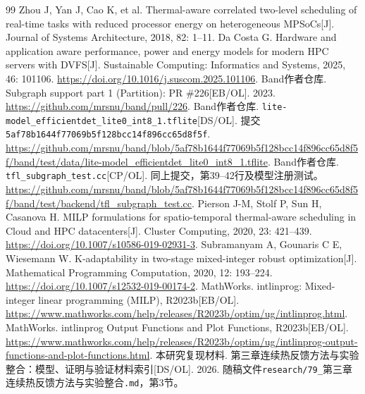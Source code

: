 \documentclass[UTF8,a4paper,12pt,openany,fontset=windows]{ctexbook}
\begin{document}
\setcounter{chapter}{2}

\begin{thebibliography}{99}
Zhou J, Yan J, Cao K, et al.
Thermal-aware correlated two-level scheduling of real-time tasks with reduced processor energy on heterogeneous MPSoCs[J].
Journal of Systems Architecture, 2018, 82: 1--11.
Da Costa G.
Hardware and application aware performance, power and energy models for modern HPC servers with DVFS[J].
Sustainable Computing: Informatics and Systems, 2025, 46: 101106.
\url{https://doi.org/10.1016/j.suscom.2025.101106}.
Band作者仓库.
Subgraph support part 1 (Partition): PR \#226[EB/OL]. 2023.
\url{https://github.com/mrsnu/band/pull/226}.
Band作者仓库.
\nolinkurl{lite-model_efficientdet_lite0_int8_1.tflite}[DS/OL].
提交\nolinkurl{5af78b1644f77069b5f128bcc14f896cc65d8f5f}.
\url{https://github.com/mrsnu/band/blob/5af78b1644f77069b5f128bcc14f896cc65d8f5f/band/test/data/lite-model_efficientdet_lite0_int8_1.tflite}.
Band作者仓库.
\nolinkurl{tfl_subgraph_test.cc}[CP/OL]. 同上提交，第39--42行及模型注册测试。
\url{https://github.com/mrsnu/band/blob/5af78b1644f77069b5f128bcc14f896cc65d8f5f/band/test/backend/tfl_subgraph_test.cc}.
Pierson J-M, Stolf P, Sun H, Casanova H.
MILP formulations for spatio-temporal thermal-aware scheduling in Cloud and HPC datacenters[J].
Cluster Computing, 2020, 23: 421--439.
\url{https://doi.org/10.1007/s10586-019-02931-3}.
Subramanyam A, Gounaris C E, Wiesemann W.
K-adaptability in two-stage mixed-integer robust optimization[J].
Mathematical Programming Computation, 2020, 12: 193--224.
\url{https://doi.org/10.1007/s12532-019-00174-2}.
MathWorks. intlinprog: Mixed-integer linear programming (MILP), R2023b[EB/OL].
\url{https://www.mathworks.com/help/releases/R2023b/optim/ug/intlinprog.html}.
MathWorks. intlinprog Output Functions and Plot Functions, R2023b[EB/OL].
\url{https://www.mathworks.com/help/releases/R2023b/optim/ug/intlinprog-output-functions-and-plot-functions.html}.
本研究复现材料. 第三章连续热反馈方法与实验整合：模型、证明与验证材料索引[DS/OL]. 2026.
随稿文件\texttt{research/79\_}第三章连续热反馈方法与实验整合\texttt{.md}，第3节。
\end{thebibliography}
\end{document}
